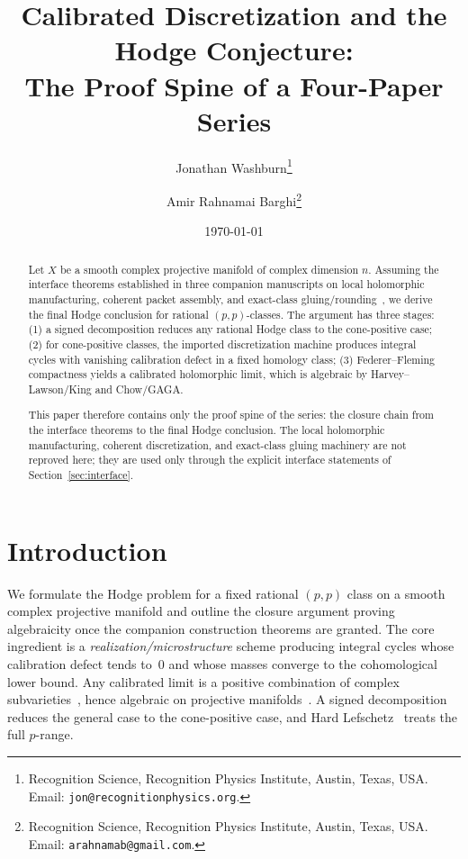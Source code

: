 \documentclass[11pt]{article}
\title{\bfseries Calibrated Discretization and the Hodge Conjecture:\\
  The Proof Spine of a Four-Paper Series}
\author{
    Jonathan Washburn\thanks{Recognition Science, Recognition Physics Institute,
        Austin, Texas, USA. Email: \texttt{jon@recognitionphysics.org}.}
    \and
    Amir Rahnamai Barghi\thanks{Recognition Science, Recognition Physics Institute,
        Austin, Texas, USA. Email: \texttt{arahnamab@gmail.com}.}
}
\date{\today}
\numberwithin{equation}{section}
\theoremstyle{plain}
\theoremstyle{definition}
\theoremstyle{remark}
\begin{document}
\maketitle

\begin{abstract}
Let $X$ be a smooth complex projective manifold of complex dimension $n$.
Assuming the interface theorems established in three companion manuscripts on
local holomorphic manufacturing, coherent packet assembly, and exact-class
gluing/rounding~\cite{Washburn26I,Washburn26II,Washburn26III}, we derive the
final Hodge conclusion for rational $(p,p)$-classes.
The argument has three stages:
(1) a signed decomposition reduces any rational Hodge class to the cone-positive case;
(2) for cone-positive classes, the imported discretization machine produces
integral cycles with vanishing calibration defect in a fixed homology class;
(3) Federer--Fleming compactness yields a calibrated holomorphic limit, which is
algebraic by Harvey--Lawson/King and Chow/GAGA.

This paper therefore contains only the proof spine of the series:
the closure chain from the interface theorems to the final Hodge conclusion.
The local holomorphic manufacturing, coherent discretization, and exact-class
gluing machinery are not reproved here; they are used only through the explicit
interface statements of Section~\ref{sec:interface}.
\end{abstract}


\section{Introduction}\label{sec:intro}

We formulate the Hodge problem for a fixed rational $(p,p)$ class on a smooth
complex projective manifold and outline the closure argument proving algebraicity
once the companion construction theorems are granted.
The core ingredient is a \emph{realization/microstructure} scheme producing
integral cycles whose calibration defect tends to~$0$ and whose masses converge
to the cohomological lower bound.  Any calibrated limit is a positive combination
of complex subvarieties~\cite{King71,HL82}, hence algebraic on projective
manifolds~\cite{Chow49,Serre56}.  A signed decomposition reduces the general
case to the cone-positive case, and Hard Lefschetz~\cite{Voisin02,GH78} treats
the full $p$-range.
\end{document}
